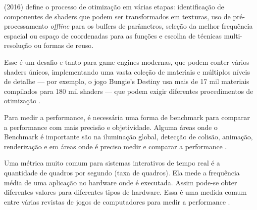  (2016) define o processo de otimização em várias etapas: identificação de componentes de shaders que podem ser transformados em texturas, uso de pré-processamento \textit{offline} para os buffers de parâmetros, seleção da melhor frequência espacial ou espaço de coordenadas para as funções e escolha de técnicas multi-resolução ou formas de reuso.

Esse é um desafio e tanto para game engines modernas, que podem conter vários shaders únicos, implementando uma vasta coleção de materiais e múltiplos níveis de detalhe --- por exemplo, o jogo Bungie’s Destiny usa mais de 17 mil materiais compilados para 180 mil shaders --- que podem exigir diferentes procedimentos de otimização \cite{he2016rapid}.

Para medir a performance, é necessária uma forma de \Gls{benchmark} para comparar a performance com mais precisão e objetividade. Alguma áreas onde o Benchmark é importante são na iluminação global, detecção de colisão, animação, renderização e em áreas onde é preciso medir e comparar a performance \cite{lext2001ray}.

Uma métrica muito comum para sistemas interativos de tempo real é a quantidade de quadros por segundo (taxa de quadros). Ela mede a frequência média de uma aplicação no hardware onde é executada. Assim pode-se obter diferentes valores para diferentes tipos de hardware. Essa é uma medida comum entre várias revistas de jogos de computadores para medir a performance \cite{rehfeld2014profile}.
